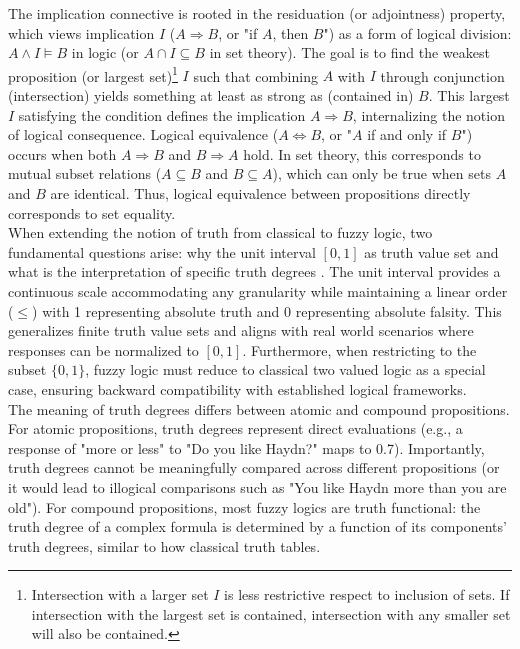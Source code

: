 The implication connective is rooted in the residuation (or adjointness) property, which views implication $I$ ($A \Rightarrow B$, or "if $A$, then $B$") as a form of logical division: $A \land I \models B$ in logic (or $A \cap I \subseteq B$ in set theory). The goal is to find the weakest proposition (or largest set)\footnote{Intersection with a larger set $I$ is less restrictive respect to inclusion of sets. If intersection with the largest set is contained, intersection with any smaller set will also be contained.} $I$ such that combining $A$ with $I$ through conjunction (intersection) yields something at least as strong as (contained in) $B$. This largest $I$ satisfying the condition defines the implication $A \Rightarrow B$, internalizing the notion of logical consequence. Logical equivalence ($A \iff B$, or "$A$ if and only if $B$") occurs when both $A \Rightarrow B$ and $B \Rightarrow A$ hold. In set theory, this corresponds to mutual subset relations ($A \subseteq B$ and $B \subseteq A$), which can only be true when sets $A$ and $B$ are identical. Thus, logical equivalence between propositions directly corresponds to set equality.\\


When extending the notion of truth from classical to fuzzy logic, two fundamental questions arise: why the unit interval $[0,1]$ as truth value set and what is the interpretation of specific truth degrees \cite[Sec.~1.1]{Hajek1998}. The unit interval provides a continuous scale accommodating any granularity while maintaining a linear order ($\leq$) with 1 representing absolute truth and 0 representing absolute falsity. This generalizes finite truth value sets and aligns with real world scenarios where responses can be normalized to $[0,1]$. Furthermore, when restricting to the subset $\{0,1\}$, fuzzy logic must reduce to classical two valued logic as a special case, ensuring backward compatibility with established logical frameworks.\\

The meaning of truth degrees differs between atomic and compound propositions. For atomic propositions, truth degrees represent direct evaluations (e.g., a response of "more or less" to "Do you like Haydn?" maps to 0.7). Importantly, truth degrees cannot be meaningfully compared across different propositions (or it would lead to illogical comparisons such as "You like Haydn more than you are old"). For compound propositions, most fuzzy logics are truth functional: the truth degree of a complex formula is determined by a function of its components' truth degrees, similar to how classical truth tables.\\



